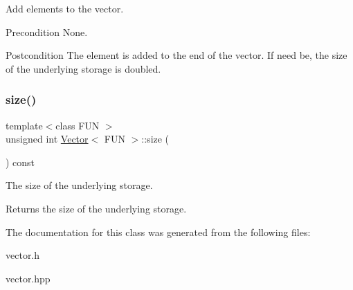 Add elements to the vector. 

\begin{DoxyPrecond}{Precondition}
None. 
\end{DoxyPrecond}
\begin{DoxyPostcond}{Postcondition}
The element is added to the end of the vector. If need be, the size of the underlying storage is doubled. 
\end{DoxyPostcond}
\mbox{\label{classVector_a21b80c989eadd6dfa49f2c01e53abd35}} 
\subsubsection{\texorpdfstring{size()}{size()}}
{\footnotesize\ttfamily template$<$class F\+UN $>$ \\
unsigned int \hyperlink{classVector}{Vector}$<$ F\+UN $>$\+::size (\begin{DoxyParamCaption}{ }\end{DoxyParamCaption}) const}



The size of the underlying storage. 

\begin{DoxyReturn}{Returns}
the size of the underlying storage. 
\end{DoxyReturn}


The documentation for this class was generated from the following files\+:\begin{DoxyCompactItemize}
\item 
vector.\+h\item 
vector.\+hpp\end{DoxyCompactItemize}
